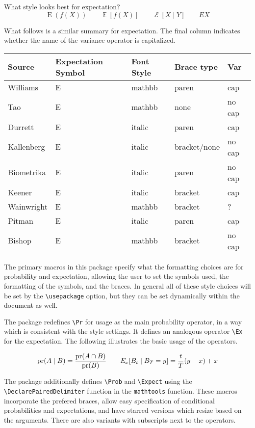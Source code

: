 \documentclass[11pt,a4paper]{ltxguide}
\begin{document}
What style looks best for expectation?
\[
    \operatorname E(f(X)) \qquad \operatorname{\mathbb E}[f(X)] \qquad \operatorname{\mathcal E}[X\mid Y] \qquad EX
\]

What follows is a similar summary for expectation.  The final column indicates whether the name of the variance operator is capitalized.

\begin{tabular}{l p{1.5cm} p{1.5cm} p{1.7cm} p{1.5cm} }
Source & Expectation Symbol&  Font Style & Brace type & Var \\
\hline
Williams & E & mathbb &  paren & cap\\
Tao & E & mathbb & none & no cap \\
Durrett & E & italic & paren & cap \\
Kallenberg & E & italic & bracket/none & no cap \\
Biometrika & E & italic & paren & no cap \\
Keener & E & italic & bracket & cap \\
Wainwright & E & mathbb & bracket & ?\\
Pitman & E & italic & paren & cap\\
Bishop & E & mathbb & bracket & no cap\\
\hline
\end{tabular}


The primary macros in this package specify what the formatting choices are for probability and expectation, allowing the user to set the symbols used, the formatting of the symbols, and the braces.  In general all of these style choices will be set by the \verb+\usepackage+ option, but they can be set dynamically within the document as well.  

The package redefines \verb+\Pr+ for usage as the main probability operator, in a way which is consistent with the style settings.  It defines an analogous operator \verb+\Ex+ for the expectation.  The following illustrates the basic usage of the operators.

\[ \operatorname{pr}( A \mid B ) = \frac{\operatorname{pr}(A \cap B)}{\operatorname{pr}(B)} \qquad {E}_x[ B_t \mid B_T =y ] = \frac t T (y-x) + x
\]

The package additionally defines \verb+\Prob+ and \verb+\Expect+ using the \verb+\DeclarePairedDelimiter+ function in the \texttt{mathtools} function.  These macros incorporate the prefered braces, allow easy specification of conditional probabilities and expectations, and have starred versions which resize based on the arguments.  There are also variants with subscripts next to the operators.
\end{document}
